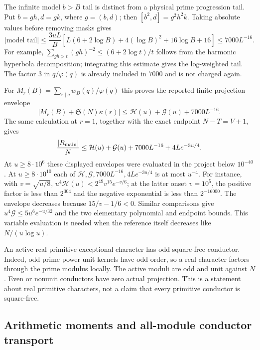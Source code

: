 \documentclass[11pt,a4paper]{article}
\theoremstyle{definition}
\theoremstyle{remark}
\begin{document}
The infinite model $b>B$ tail is distinct from a physical prime
progression tail. Put $b=gh,d=gk$, where $g=(b,d)$; then
$[b^2,d]=g^2h^2k$. Taking absolute values before removing masks gives
\[
 |\text{model tail}|\leq\frac{3uL}{B}
    [L(6+2\log B)+4(\log B)^2+16\log B+16]
 \leq7000L^{-16}.
\]
For example, $\sum_{gh>t}(gh)^{-2}\leq(6+2\log t)/t$ follows
from the harmonic hyperbola decomposition; integrating this estimate
gives the log-weighted tail. The factor $3$ in $q/\varphi(q)$ is
already included in $7000$ and is not charged again.

For $M_r(B)=\sum_{r\mid q}w_B(q)/\varphi(q)$ this proves the
reported finite projection envelope
\begin{equation}\label{eq:ext-projection}
 |M_r(B)+\mathfrak S(N)\kappa(r)|
       \leq\mathcal H(u)+\mathcal G(u)+7000L^{-16}.
\end{equation}
The same calculation at $r=1$, together with the exact endpoint
$N-T=V+1$, gives
\begin{equation}\label{eq:ext-Rmain}
 \frac{|R_{\rm main}|}{N}
 \leq\mathcal H(u)+\mathcal G(u)+7000L^{-16}
                              +4Le^{-3u/4}.
\end{equation}
At $u\geq8\cdot10^6$ these displayed envelopes were evaluated in
the project below $10^{-40}$. At $u\geq8\cdot10^{10}$ each of
$\mathcal H,\mathcal G,7000L^{-16},4Le^{-3u/4}$ is at most $u^{-4}$.
For instance, with $v=\sqrt{u/8}$,
$u^4\mathcal H(u)<2^{49}v^{15}e^{-v/6}$; at the latter onset
$v=10^5$, the positive factor is less than $2^{304}$ and the
negative exponential is less than $2^{-16000}$. The envelope decreases
because $15/v-1/6<0$. Similar comparisons give
$u^4\mathcal G\leq5u^6e^{-u/32}$ and the two elementary polynomial
and endpoint bounds. This variable evaluation is needed when the
reference itself decreases like $N/(u\log u)$.

An active real primitive exceptional character has odd square-free
conductor. Indeed, odd prime-power unit kernels have odd order, so a
real character factors through the prime modulus locally. The active
moduli are odd and unit against $N$. Even or nonunit conductors have
zero actual projection. This is a statement about real primitive
characters, not a claim that every primitive conductor is square-free.

\subsection{Arithmetic moments and all-module conductor transport}
\end{document}

